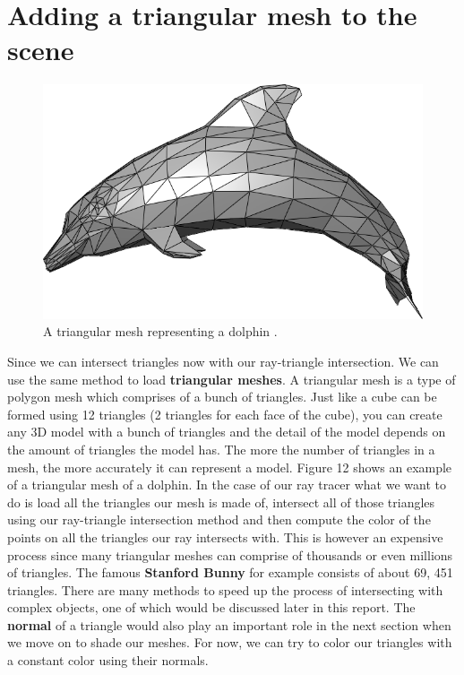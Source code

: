 \documentclass[11pt,a4paper]{article}
\begin{document}
	\section{Adding a triangular mesh to the scene}

\begingroup
\setlength{\intextsep}{0pt}
\setlength{\columnsep}{15pt}

\begin{figure}
	\centering
	\includegraphics[width=\linewidth]{dolphin_mesh.png}
	\caption{A triangular mesh representing a dolphin \protect\cite{trianglemesh}.}\label{fig:dolphin mesh}
\end{figure}
Since we can intersect triangles now with our ray-triangle intersection. We can use the same method to load \textbf{triangular meshes}. A triangular mesh is a type of polygon mesh which comprises of a bunch of triangles. Just like a cube can be formed using 12 triangles (2 triangles for each face of the cube), you can create any 3D model with a bunch of triangles and the detail of the model depends on the amount of triangles the model has. The more the number of triangles in a mesh, the more accurately it can represent a model. Figure 12 shows an example of a triangular mesh of a dolphin. In the case of our ray tracer what we want to do is load all the triangles our mesh is made of, intersect all of those triangles using our ray-triangle intersection method and then compute the color of the points on all the triangles our ray intersects with. This is however an expensive process since many triangular meshes can comprise of thousands or even millions of triangles. The famous \textbf{Stanford Bunny} \cite{stanfordbunny} for example consists of about 69, 451 triangles. There are many methods to speed up the process of intersecting with complex objects, one of which would be discussed later in this report. The \textbf{normal} of a triangle would also play an important role in the next section when we move on to shade our meshes. For now, we can try to color our triangles with a constant color using their normals.
\end{document}
